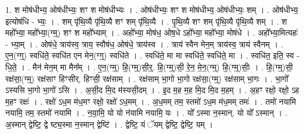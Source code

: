 \documentclass[17pt]{extarticle}
\begin{document}
1. श मोष॑धीभ्य॒ ओष॑धीभ्यः॒ शꣳ श मोष॑धीभ्यः । . ओष॑धीभ्यः॒ शꣳ श मोष॑धीभ्य॒ ओष॑धीभ्यः॒ शम् । . ओष॑धीभ्य॒ इत्योष॑धि - भ्यः॒ । . शम् पृ॑थि॒व्यै पृ॑थि॒व्यै शꣳ शम् पृ॑थि॒व्यै । . पृ॒थि॒व्यै शꣳ शम् पृ॑थि॒व्यै पृ॑थि॒व्यै शम् । . श महो᳚भ्या॒ महो᳚भ्या॒(ग्म्॒) शꣳ श महो᳚भ्याम् । . अहो᳚भ्या॒ मोष॑ध॒ ओष॒धे ऽहो᳚भ्या॒ महो᳚भ्या॒ मोष॑धे । . अहो᳚भ्या॒मित्यहः॑ - भ्या॒म् । . ओष॑धे॒ त्राय॑स्व॒ त्राय॒ स्वौष॑ध॒ ओष॑धे॒ त्राय॑स्व । . त्राय॑ स्वैन मेन॒म् त्राय॑स्व॒ त्राय॑ स्वैनम् । . ए॒न॒(ग्ग्॒) स्वधि॑ते॒ स्वधि॑त एन मेन॒(ग्ग्॒) स्वधि॑ते । . स्वधि॑ते॒ मा मा स्वधि॑ते॒ स्वधि॑ते॒ मा । . स्वधि॑त॒ इति॒ स्व - धि॒ते॒ । . मैन॑ मेन॒म् मा मैन᳚म् । . ए॒न॒(ग्म्॒) हि॒(ग्म्॒)सी॒र्॒. हि॒(ग्म्॒)सी॒ रे॒न॒ मे॒न॒(ग्म्॒) हि॒(ग्म्॒)सीः॒ । . हि॒(ग्म्॒)सी॒ रक्ष॑सा॒(ग्म्॒) रक्ष॑साꣳ हिꣳसीर्. हिꣳसी॒ रक्ष॑साम् । . रक्ष॑साम् भा॒गो भा॒गो रक्ष॑सा॒(ग्म्॒) रक्ष॑साम् भा॒गः । . भा॒गो᳚ ऽस्यसि भा॒गो भा॒गो॑ ऽसि । . अ॒सी॒द मि॒द म॑स्यसी॒दम् । . इ॒द म॒ह म॒ह मि॒द मि॒द म॒हम् । . अ॒हꣳ रक्षो॒ रक्षो॒ ऽह म॒हꣳ रक्षः॑ । . रक्षो॑ ऽध॒म म॑ध॒मꣳ रक्षो॒ रक्षो॑ ऽध॒मम् । . अ॒ध॒मम् तम॒ स्तमो॑ ऽध॒म म॑ध॒मम् तमः॑ । . तमो॑ नयामि नयामि॒ तम॒ स्तमो॑ नयामि । . न॒या॒मि॒ यो यो न॑यामि नयामि॒ यः । . यो᳚ ऽस्मा न॒स्मान्. यो यो᳚ ऽस्मान् । . अ॒स्मान् द्वेष्टि॒ द्वे ष्ट्य॒स्मा न॒स्मान् द्वेष्टि॑ । . द्वेष्टि॒ यं ॅयम् द्वेष्टि॒ द्वेष्टि॒ यम् । \newline
\end{document}
